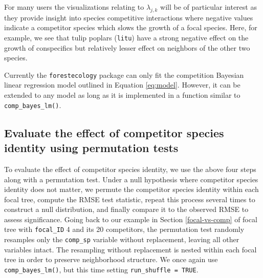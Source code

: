 \documentclass[12pt]{article}
\newenvironment{Shaded}{\begin{snugshade}}{\end{snugshade}}
\newcommand{\DataTypeTok}[1]{\textcolor[rgb]{0.13,0.29,0.53}{#1}}
\newcommand{\KeywordTok}[1]{\textcolor[rgb]{0.13,0.29,0.53}{\textbf{#1}}}
\newcommand{\NormalTok}[1]{#1}
\newcommand{\OperatorTok}[1]{\textcolor[rgb]{0.81,0.36,0.00}{\textbf{#1}}}
\newcommand{\OtherTok}[1]{\textcolor[rgb]{0.56,0.35,0.01}{#1}}
\newcommand{\StringTok}[1]{\textcolor[rgb]{0.31,0.60,0.02}{#1}}
\begin{document}
For many users the visualizations relating to \(\lambda_{j,k}\) will be
of particular interest as they provide insight into species competitive
interactions where negative values indicate a competitor species which
slows the growth of a focal species. Here, for example, we see that
tulip poplars (\texttt{litu}) have a strong negative effect on the
growth of conspecifics but relatively lesser effect on neighbors of the
other two species.

Currently the \texttt{forestecology} package can only fit the
competition Bayesian linear regression model outlined in Equation
\ref{eq:model}. However, it can be extended to any model as long as it
is implemented in a function similar to \texttt{comp\_bayes\_lm()}.

\hypertarget{permutation-test}{%
\subsection{Evaluate the effect of competitor species identity using
permutation tests}\label{permutation-test}}

To evaluate the effect of competitor species identity, we use the above
four steps along with a permutation test. Under a null hypothesis where
competitor species identity does not matter, we permute the competitor
species identity within each focal tree, compute the RMSE test
statistic, repeat this process several times to construct a null
distribution, and finally compare it to the observed RMSE to assess
significance. Going back to our example in Section \ref{focal-vs-comp}
of focal tree with \texttt{focal\_ID} 4 and its 20 competitors, the
permutation test randomly resamples only the \texttt{comp\_sp} variable
without replacement, leaving all other variables intact. The resampling
without replacement is nested within each focal tree in order to
preserve neighborhood structure. We once again use
\texttt{comp\_bayes\_lm()}, but this time setting
\texttt{run\_shuffle\ =\ TRUE}.

\begin{Shaded}
\end{Shaded}
\end{document}
